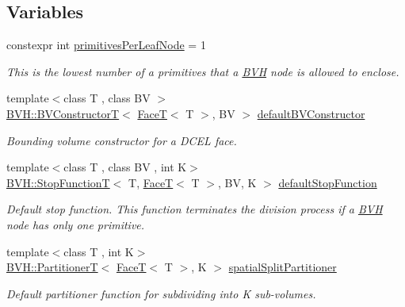 \subsection*{Variables}
\begin{DoxyCompactItemize}
\item 
\mbox{\label{namespaceDcel_a4db11eb50441e7c4e6c3ae796a202024}} 
constexpr int \hyperlink{namespaceDcel_a4db11eb50441e7c4e6c3ae796a202024}{primitives\+Per\+Leaf\+Node} = 1
\begin{DoxyCompactList}\small\item\em This is the lowest number of a primitives that a \hyperlink{namespaceBVH}{B\+VH} node is allowed to enclose. \end{DoxyCompactList}\item 
{\footnotesize template$<$class T , class BV $>$ }\\\hyperlink{namespaceBVH_a245702d7eff40cdaedb5dff68c25a88a}{B\+V\+H\+::\+B\+V\+ConstructorT}$<$ \hyperlink{classDcel_1_1FaceT}{FaceT}$<$ T $>$, BV $>$ \hyperlink{namespaceDcel_a628449c42ce3f2784ca018f2a3c88a11}{default\+B\+V\+Constructor}
\begin{DoxyCompactList}\small\item\em Bounding volume constructor for a D\+C\+EL face. \end{DoxyCompactList}\item 
{\footnotesize template$<$class T , class BV , int K$>$ }\\\hyperlink{namespaceBVH_afef1c5979c34a11d23b756cc09654bf9}{B\+V\+H\+::\+Stop\+FunctionT}$<$ T, \hyperlink{classDcel_1_1FaceT}{FaceT}$<$ T $>$, BV, K $>$ \hyperlink{namespaceDcel_a45e9f2554a8d9ea01164cd51f787f989}{default\+Stop\+Function}
\begin{DoxyCompactList}\small\item\em Default stop function. This function terminates the division process if a \hyperlink{namespaceBVH}{B\+VH} node has only one primitive. \end{DoxyCompactList}\item 
{\footnotesize template$<$class T , int K$>$ }\\\hyperlink{namespaceBVH_a7c33d54da9893d506709b2ca96b76f55}{B\+V\+H\+::\+PartitionerT}$<$ \hyperlink{classDcel_1_1FaceT}{FaceT}$<$ T $>$, K $>$ \hyperlink{namespaceDcel_ab4f869248e23d47bb01ad06c76288fef}{spatial\+Split\+Partitioner}
\begin{DoxyCompactList}\small\item\em Default partitioner function for subdividing into K sub-\/volumes. \end{DoxyCompactList}\item 

\end{DoxyCompactItemize}
